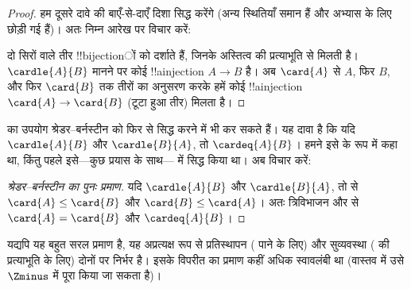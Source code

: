 \documentclass[../../../include/open-logic-section]{subfiles}
\begin{document}
\begin{proof}
हम दूसरे दावे की बाएँ-से-दाएँ दिशा सिद्ध करेंगे (अन्य स्थितियाँ समान हैं
और अभ्यास के लिए छोड़ी गई हैं)। अतः निम्न आरेख पर विचार करें:
\begin{center}
\end{center}
दो सिरों वाले तीर !!{bijection}ों को दर्शाते हैं, जिनके अस्तित्व की
प्रत्याभूति  से मिलती है। $\cardle{A}{B}$ मानने
पर कोई !!a{injection} $A\to B$ है। अब $\card{A}$ से $A$, फिर $B$, और फिर
$\card{B}$ तक तीरों का अनुसरण करके हमें कोई !!a{injection}
$\card{A}\to\card{B}$ (टूटा हुआ तीर) मिलता है।
\end{proof}\noindent
{} का उपयोग श्रेडर--बर्नस्टीन को फिर से
सिद्ध करने में भी कर सकते हैं। यह दावा है कि यदि $\cardle{A}{B}$ और
$\cardle{B}{A}$, तो $\cardeq{A}{B}$। हमने इसे
 के रूप में कहा था, किंतु पहले
इसे---कुछ प्रयास के साथ--- में सिद्ध
किया था। अब विचार करें:

\begin{proof}[श्रेडर--बर्नस्टीन का पुनः प्रमाण]
यदि $\cardle{A}{B}$ और $\cardle{B}{A}$, तो
 से $\card{A}\leq\card{B}$ और
$\card{B}\leq\card{A}$। अतः त्रिविभाजन और
 से $\card{A}=\card{B}$ और
$\cardeq{A}{B}$।
\end{proof}
\noindent
यद्यपि यह बहुत सरल प्रमाण है, यह अप्रत्यक्ष रूप से प्रतिस्थापन
( पाने के लिए) और
सुव्यवस्था ( की प्रत्याभूति के लिए) दोनों
पर निर्भर है। इसके विपरीत  का प्रमाण
कहीं अधिक स्वावलंबी था (वास्तव में उसे $\Zminus$ में पूरा किया जा सकता है)।
\end{document}
